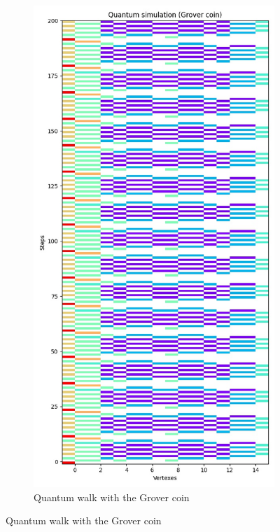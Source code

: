 \begin{figure}[H]
  \centering
  \begin{subfigure}{.45\linewidth}
    \centering
    \includegraphics[width=\linewidth]{./figures/results/hypercube/grover.jpg}
    \caption{Quantum walk with the Grover coin}

\end{subfigure}
\end{figure}
